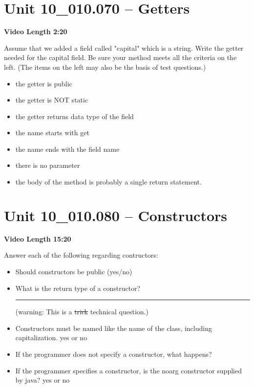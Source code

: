 \documentclass[letterpaper,12pt]{exam}
\newcommand{\unit}{Unit 10}
\begin{document}
\begin{questions}
\section*{\unit\_010.070 -- Getters} 
\par{\selectfont\textbf{Video Length 2:20}}
\begin{samepage}
    \question Assume that we added a field called "capital" which is a string.  Write the getter needed for the capital field.  Be sure your method meets all the criteria on the left. (The items on the left may also be the basis of test questions.)
    \begin{itemize}
        \item the getter is public
        \item the getter is NOT static
        \item the getter returns data type of the field
        \item the name starts with get
        \item the name ends with the field name
        \item there is no parameter
        \item the body of the method is probably a single return statement.
    \end{itemize}
    \vspace{5mm}
\end{samepage}

\section*{\unit\_010.080 -- Constructors} 
\par{\selectfont\textbf{Video Length 15:20}}
\begin{samepage}
    \question Answer each of the following regarding contructors:
      \begin{itemize}
        \item Should constructors be public (yes/no)
        \vspace{5mm}
        \item What is the return type of a constructor? \rule{20mm}{0.35mm} (warning: This is a \st{trick} technical question.)
        \vspace{5mm}
        \item Constructors must be named like the name of the class, including capitalization. yes or no
        \vspace{5mm}
        \item If the programmer does not specify a constructor, what happens?
        \vspace{15mm}
        \item If the programmer specifies a constructor, is the noarg constructor supplied by java? yes or no
        \vspace{5mm}
       \end{itemize}
\end{samepage}


\end{questions}
\end{document}
